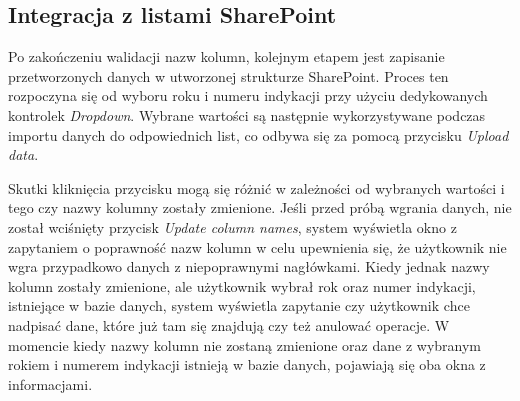 
\subsection{Integracja z listami SharePoint} Po zakończeniu walidacji nazw kolumn, kolejnym etapem jest zapisanie przetworzonych danych w utworzonej strukturze SharePoint. Proces ten rozpoczyna się od wyboru roku i numeru indykacji przy użyciu dedykowanych kontrolek \emph{Dropdown}. Wybrane wartości są następnie wykorzystywane podczas importu danych do odpowiednich list, co odbywa się za pomocą przycisku \emph{Upload data}.

Skutki kliknięcia przycisku mogą się różnić w zależności od wybranych wartości i tego czy nazwy kolumny zostały zmienione. Jeśli przed próbą wgrania danych, nie został wciśnięty przycisk \emph{Update column names}, system wyświetla okno z zapytaniem o poprawność nazw kolumn w celu upewnienia się, że użytkownik nie wgra przypadkowo danych z niepoprawnymi nagłówkami.
Kiedy jednak nazwy kolumn zostały zmienione, ale użytkownik wybrał rok oraz numer indykacji, istniejące w bazie danych, system wyświetla zapytanie czy użytkownik chce nadpisać dane, które już tam się znajdują czy też anulować operacje. W momencie kiedy nazwy kolumn nie zostaną zmienione oraz dane z wybranym rokiem i numerem indykacji istnieją w bazie danych, pojawiają się oba okna z informacjami.



